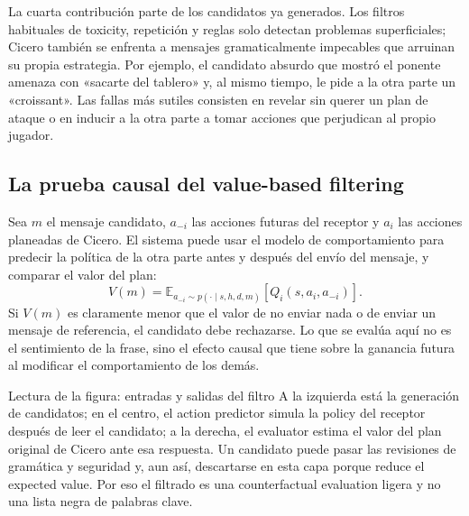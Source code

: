 La cuarta contribución parte de los candidatos ya generados. Los filtros habituales de toxicity, repetición y reglas solo detectan problemas superficiales; Cicero también se enfrenta a mensajes gramaticalmente impecables que arruinan su propia estrategia. Por ejemplo, el candidato absurdo que mostró el ponente amenaza con «sacarte del tablero» y, al mismo tiempo, le pide a la otra parte un «croissant». Las fallas más sutiles consisten en revelar sin querer un plan de ataque o en inducir a la otra parte a tomar acciones que perjudican al propio jugador.


\subsection{La prueba causal del value-based filtering}

Sea $m$ el mensaje candidato, $a_{-i}$ las acciones futuras del receptor y $a_i$ las acciones planeadas de Cicero. El sistema puede usar el modelo de comportamiento para predecir la política de la otra parte antes y después del envío del mensaje, y comparar el valor del plan:
\begin{equation}
V(m)
=\mathbb{E}_{a_{-i}\sim p(\cdot\mid s,h,d,m)}
\left[Q_i(s,a_i,a_{-i})\right].
\end{equation}
Si $V(m)$ es claramente menor que el valor de no enviar nada o de enviar un mensaje de referencia, el candidato debe rechazarse. Lo que se evalúa aquí no es el sentimiento de la frase, sino el efecto causal que tiene sobre la ganancia futura al modificar el comportamiento de los demás.


\begin{knowledgebox}{Lectura de la figura: entradas y salidas del filtro}
A la izquierda está la generación de candidatos; en el centro, el action predictor simula la policy del receptor después de leer el candidato; a la derecha, el evaluator estima el valor del plan original de Cicero ante esa respuesta. Un candidato puede pasar las revisiones de gramática y seguridad y, aun así, descartarse en esta capa porque reduce el expected value. Por eso el filtrado es una counterfactual evaluation ligera y no una lista negra de palabras clave.
\end{knowledgebox}

